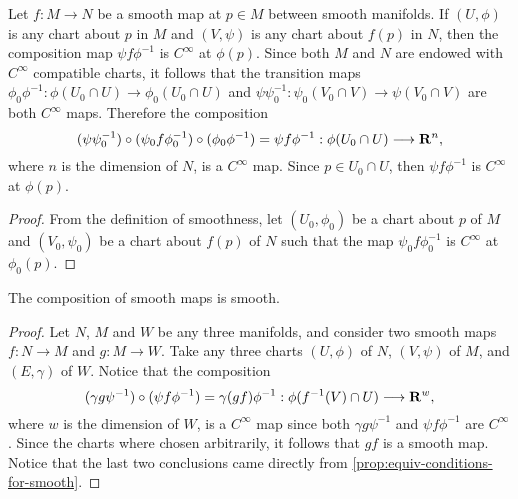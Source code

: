 \begin{lemma}
    \label{lem:smooth-maps-choice-independent}
    Let \(f: M \to N\) be a smooth map at \(p \in M\) between smooth manifolds. If
    \((U, \phi)\) is any chart about \(p\) in \(M\) and \((V, \psi)\) is any chart
    about \(f(p)\) in \(N\), then the composition map \(\psi f \phi^{-1}\) is
    \(C^{\infty}\) at \(\phi(p)\). Since both \(M\) and \(N\) are endowed with
    \(C^{\infty}\) compatible charts, it follows that the transition maps
    \(\phi_0 \phi^{-1}: \phi(U_0 \cap U) \to \phi_0(U_{0} \cap U)\) and
    \(\psi \psi_0^{-1}: \psi_0(V_0 \cap V) \to \psi(V_0 \cap V)\) are both
    \(C^{\infty}\) maps. Therefore the composition
    \[
        (\psi \psi_0^{-1}) \circ (\psi_0 f \phi_0^{-1}) \circ (\phi_0 \phi^{-1})
        = \psi f \phi^{-1}: \phi(U_0 \cap U) \longrightarrow \mathbf{R}^n,
    \]
    where \(n\) is the dimension of \(N\), is a \(C^{\infty}\) map. Since \(p \in
    U_0 \cap U\), then \(\psi f \phi^{-1}\) is \(C^{\infty}\) at \(\phi(p)\).
\end{lemma}

\begin{proof}
    From the definition of smoothness, let \((U_0, \phi_0)\) be a chart about \(p\)
    of \(M\) and \((V_0, \psi_0)\) be a chart about \(f(p)\) of \(N\) such that the
    map \(\psi_0 f \phi_0^{-1}\) is \(C^{\infty}\) at \(\phi_0(p)\).
\end{proof}

\begin{proposition}
    \label{prop:composition-smooth-maps-is-smooth}
    The composition of smooth maps is smooth.
\end{proposition}

\begin{proof}
    Let \(N\), \(M\) and \(W\) be any three manifolds, and consider two smooth maps
    \(f: N \to M\) and \(g: M \to W\). Take any three charts \((U, \phi)\) of \(N\),
    \((V, \psi)\) of \(M\), and \((E, \gamma)\) of \(W\). Notice that the
    composition
    \[
        (\gamma g \psi^{-1}) \circ (\psi f \phi^{-1})
        = \gamma (g f) \phi^{-1}: \phi(f^{-1}(V) \cap U)
        \longrightarrow \mathbf{R}^w,
    \]
    where \(w\) is the dimension of \(W\), is a \(C^{\infty}\) map since both
    \(\gamma g \psi^{-1}\) and \(\psi f \phi^{-1}\) are \(C^{\infty}\). Since the
    charts where chosen arbitrarily, it follows that \(g f\) is a smooth map. Notice
    that the last two conclusions came directly from
    \cref{prop:equiv-conditions-for-smooth}.
\end{proof}

